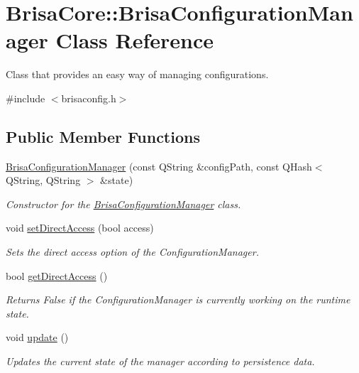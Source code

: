 \hypertarget{classBrisaCore_1_1BrisaConfigurationManager}{
\section{BrisaCore::BrisaConfigurationManager Class Reference}
\label{classBrisaCore_1_1BrisaConfigurationManager}
}


Class that provides an easy way of managing configurations.  


{\ttfamily \#include $<$brisaconfig.h$>$}\subsection*{Public Member Functions}
\begin{DoxyCompactItemize}
\item 
\hyperlink{classBrisaCore_1_1BrisaConfigurationManager_a4bc1f6a85872924f96d86ac4193a1363}{BrisaConfigurationManager} (const QString \&configPath, const QHash$<$ QString, QString $>$ \&state)
\begin{DoxyCompactList}\small\item\em Constructor for the \hyperlink{classBrisaCore_1_1BrisaConfigurationManager}{BrisaConfigurationManager} class. \item\end{DoxyCompactList}\item 
void \hyperlink{classBrisaCore_1_1BrisaConfigurationManager_add1eabc42cefd0aa066222a60b70df71}{setDirectAccess} (bool access)
\begin{DoxyCompactList}\small\item\em Sets the direct access option of the ConfigurationManager. \item\end{DoxyCompactList}\item 
bool \hyperlink{classBrisaCore_1_1BrisaConfigurationManager_aa32b2a7e909192182c879c72c047d895}{getDirectAccess} ()
\begin{DoxyCompactList}\small\item\em Returns False if the ConfigurationManager is currently working on the runtime state. \item\end{DoxyCompactList}\item 
void \hyperlink{classBrisaCore_1_1BrisaConfigurationManager_a0e3ce5560d14df248cd95338f83dbb2e}{update} ()
\begin{DoxyCompactList}\small\item\em Updates the current state of the manager according to persistence data. \item\end{DoxyCompactList}\item 

\end{DoxyCompactItemize}
